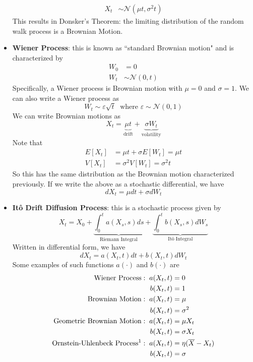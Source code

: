 \documentclass[12pt]{article}
\begin{document}
\begin{itemize}
\[\begin{split}
        X_t &\sim \mathcal{N}(\mu t, \sigma^2 t)
    \end{split}\]
    This results in Donsker's Theorem: the limiting distribution of the random walk process is a Brownian Motion. 
    \item \textbf{Wiener Process}: this is known as ``standard Brownian motion" and is characterized by
    \[\begin{split}
        W_0 &= 0 \\
        W_t &\sim \mathcal{N}(0,t)
    \end{split}\]
    Specifically, a Wiener process is Brownian motion with $\mu = 0$ and $\sigma = 1$. We can also write a Wiener process as 
    \[W_t \sim \varepsilon\sqrt{t} \;\text{ where } \varepsilon \sim \mathcal{N}(0,1)\]
    We can write Brownian motions as
    \[X_t = \underbrace{\mu t}_{\text{drift}} + \underbrace{\sigma W_t}_{\text{volatility}}\]
    Note that 
    \[\begin{split}
        E[X_t] &= \mu t + \sigma E[W_t] = \mu t \\
        V[X_t] &= \sigma^2 V[W_t] = \sigma^2 t
    \end{split}\]
    So this has the same distribution as the Brownian motion characterized previously. If we write the above as a stochastic differential, we have
    \[dX_t = \mu dt + \sigma dW_t\]
    \item \textbf{Itô Drift Diffusion Process}: this is a stochastic process given by
    \[X_t = X_0 + \underbrace{\int_0^ta(X_s, s)ds}_{\text{Riemann Integral}} + \underbrace{\int_0^tb(X_s, s)dW_s}_{\text{Itô Integral}}\]
    Written in differential form, we have
    \[dX_t = a(X_t, t)dt + b(X_t, t)dW_t\]
    Some examples of such functions $a(\cdot)$ and $b(\cdot)$ are
    \[\begin{split}
        \text{Wiener Process}:\; a(X_t,t) &= 0 \\ 
        b(X_t,t) &= 1 \\
        \text{Brownian Motion}:\; a(X_t,t) &= \mu \\
        b(X_t,t) &= \sigma^2 \\
        \text{Geometric Brownian Motion}:\; a(X_t,t) &= \mu X_t \\
        b(X_t,t) &= \sigma X_t \\
        \text{Ornstein-Uhlenbeck Process\footnote{This is a continuous time analog to AR(1)}}:\; a(X_t,t) &= \eta (\overline{X} - X_t) \\
        b(X_t,t) &= \sigma
    \end{split}\]

\end{itemize}
\end{document}
